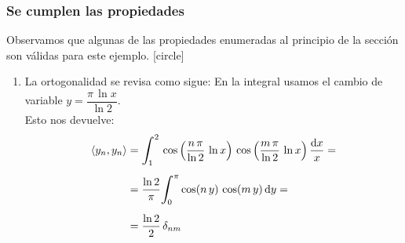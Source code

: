 \documentclass[12pt]{beamer}
\begin{document}
\begin{frame}
\frametitle{Se cumplen las propiedades}
Observamos que algunas de las propiedades enumeradas al principio de la sección son válidas para este ejemplo.
\pause
{}
[circle]
\begin{enumerate}[<+->]
\conti
\item La ortogonalidad se revisa como sigue: En la integral usamos el cambio de variable $y = \dfrac{\pi \, \ln x}{\ln 2}$.
\\
\pause
Esto nos devuelve:
\begin{eqnarray}
\begin{aligned}[b]
\langle y_{n}, y_{n} \rangle &= \scaleint{6ex}_{\bs 1}^{2} \, \cos \left( \dfrac{n \, \pi}{\ln 2} \, \ln x \right) \, \cos \left( \dfrac{m \, \pi}{\ln 2} \, \ln x \right) \dfrac{\dd{x}}{x} = \\[0.5em]
&= \dfrac{\ln 2}{\pi} \scaleint{6ex}_{\bs 0}^{\pi} \cos (n \, y) \, \cos (m \, y) \dd{y} = \\[0.5em]
&= \dfrac{\ln 2}{2} \, \delta_{nm}
\end{aligned}
\label{eq:ecuacion_04_16}
\end{eqnarray}
\end{enumerate}
\end{frame}                
\end{document}
